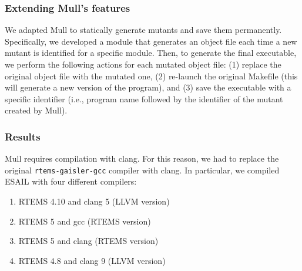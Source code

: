 \subsubsection{Extending Mull's features}


We adapted Mull to statically generate mutants and save them permanently. Specifically, we developed a module that generates an object file each time a new mutant is identified for a specific module. Then, to generate the final executable, we perform the following actions for each mutated object file: (1) replace the original object file with the mutated one, (2) re-launch the original Makefile (this will generate a new version of the program), and (3) save the executable with a specific identifier (i.e., program name followed by the identifier of the mutant created by Mull).

\subsubsection{Results}

Mull requires compilation with clang. For this reason, we had to replace the original \texttt{rtems-gaisler-gcc} compiler with clang. In particular, we compiled ESAIL with four different compilers:

\begin{enumerate}
	\item RTEMS 4.10 and clang 5 (LLVM version)
	\item RTEMS 5 and gcc (RTEMS version)
	\item RTEMS 5 and clang (RTEMS version)
	\item RTEMS 4.8 and clang 9 (LLVM version)
\end{enumerate}

